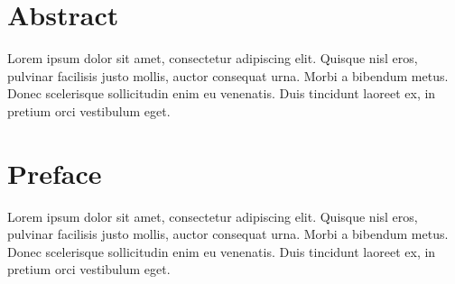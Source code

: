 \newpage
\section{Abstract}
Lorem ipsum dolor sit amet, consectetur adipiscing elit. Quisque nisl eros, 
pulvinar facilisis justo mollis, auctor consequat urna. Morbi a bibendum metus. 
Donec scelerisque sollicitudin enim eu venenatis. Duis tincidunt laoreet ex, 
in pretium orci vestibulum eget.

\section{Preface}
Lorem ipsum dolor sit amet, consectetur adipiscing elit. Quisque nisl eros, 
pulvinar facilisis justo mollis, auctor consequat urna. Morbi a bibendum metus. 
Donec scelerisque sollicitudin enim eu venenatis. Duis tincidunt laoreet ex, 
in pretium orci vestibulum eget.
